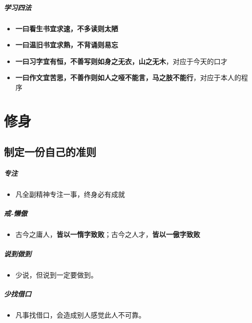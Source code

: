 \documentclass[UTF8,a4paper,8pt]{ctexbook}
\begin{document}
	\paragraph{学习四法}
		\begin{itemize}
			\item \textbf{一曰看生书宜求速，不多读则太陋}
			\item \textbf{一曰温旧书宜求熟，不背诵则易忘}
			\item \textbf{一曰习字宜有恒，不善写则如身之无衣，山之无木}，对应于今天的口才
			\item \textbf{一曰作文宜苦思，不善作则如人之哑不能言，马之肢不能行}，对应于本人的程序
		\end{itemize}
\chapter{修身}    
    \section{制定一份自己的准则}
	    \paragraph{专注} 
		    \begin{itemize}
		    	\item 凡全副精神专注一事，终身必有成就
		    \end{itemize}
	    
	    \paragraph{戒-懒傲}
		    \begin{itemize}
		    	\item 古今之庸人，\textbf{皆以一惰字致败}；古今之人才，\textbf{皆以一傲字致败}	
		    \end{itemize}
		        
	    \paragraph{说到做到}
		    \begin{itemize}
		    	\item 少说，但说到一定要做到。
		    \end{itemize}
	     
	    \paragraph{少找借口} 
		    \begin{itemize}
		    	\item 凡事找借口，会造成别人感觉此人不可靠。
		    \end{itemize}
	    
\end{document}

